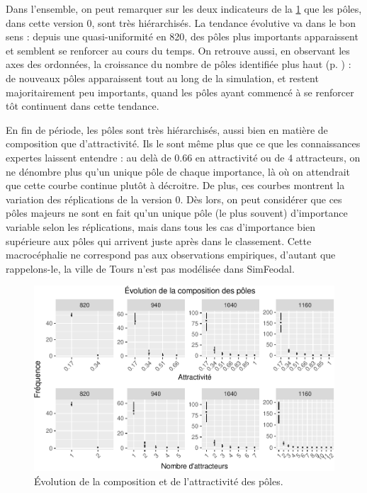 \begin{mdframed}[backgroundcolor=gray!10,footnoteinside=false]
	Dans l'ensemble, on peut remarquer sur les deux indicateurs de la \cref{fig:compo-poles-v0} que les pôles, dans cette version 0, sont très hiérarchisés. La tendance \og évolutive va dans le bon sens : depuis une quasi-uniformité en 820, des pôles plus importants apparaissent et semblent se renforcer au cours du temps. On retrouve aussi, en observant les axes des ordonnées, la croissance du nombre de pôles identifiée plus haut (p. \pageref{para:nb-poles}) : de nouveaux pôles apparaissent tout au long de la simulation, et restent majoritairement peu importants, quand les pôles ayant commencé à se renforcer tôt continuent dans cette tendance.
	
	En fin de période, les pôles sont très hiérarchisés, aussi bien en matière de composition que d'attractivité. Ils le sont même plus que ce que les connaissances expertes laissent entendre : au delà de $0.66$ en attractivité ou de $4$ attracteurs, on ne dénombre plus qu'un unique pôle de chaque importance, là où on attendrait que cette courbe continue plutôt à décroitre.
	De plus, ces courbes montrent la variation des réplications de la version 0.
	Dès lors, on peut considérer que ces pôles majeurs ne sont en fait qu'un unique pôle (le plus souvent) d'importance variable selon les réplications, mais dans tous les cas d'importance bien supérieure aux pôles qui arrivent juste après dans le classement. Cette macrocéphalie ne correspond pas aux observations empiriques, d'autant que rappelons-le, la ville de Tours n'est pas modélisée dans SimFeodal.	
	

\end{mdframed}

\begin{figure}[H]
	\captionsetup{width=\linewidth}
	\includegraphics[width=\linewidth]{img/resultats/v0_compo_poles.pdf}
	\caption{Évolution de la composition et de l'attractivité des pôles\protect\footnotemark{}.} 
	\label{fig:compo-poles-v0}
\end{figure}

